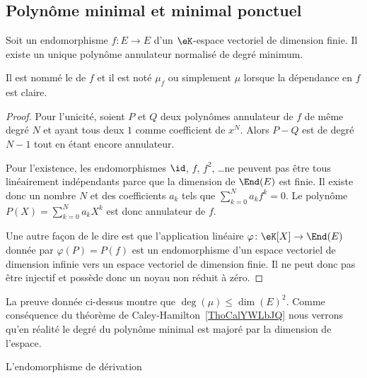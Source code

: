 \subsection{Polynôme minimal et minimal ponctuel}

\begin{lemmaDef}        \label{DefooOHUXooNkPWaB}
    Soit un endomorphisme \( f\colon E\to E\) d'un \( \eK\)-espace vectoriel de dimension finie. Il existe un unique polynôme annulateur normalisé de degré minimum.

    Il est nommé le  de \( f\) et il est noté \( \mu_f\) ou simplement \( \mu\) lorsque la dépendance en \( f\) est claire.
\end{lemmaDef}

\begin{proof}
    Pour l'unicité, soient \( P\) et \( Q\) deux polynômes annulateur de \( f\) de même degré \( N\) et ayant tous deux \( 1\) comme coefficient de \( x^N\). Alors \( P-Q\) est de degré \( N-1\) tout en étant encore annulateur.

    Pour l'existence, les endomorphismes \( \id\), \( f\), \( f^2\), \ldots ne peuvent pas être tous linéairement indépendants parce que la dimension de \( \End(E)\) est finie. Il existe donc un nombre \( N\) et des coefficients \( a_k\) tels que \( \sum_{k=0}^Na_kf^k=0\). Le polynôme \( P(X)=\sum_{k=0}^Na_kX^k\) est donc annulateur de \( f\).

    Une autre façon de le dire est que l'application linéaire \( \varphi\colon \eK[X]\to \End(E)\) donnée par \( \varphi(P)=P(f)\) est un endomorphisme d'un espace vectoriel de dimension infinie vers un espace vectoriel de dimension finie. Il ne peut donc pas être injectif et possède donc un noyau non réduit à zéro.
\end{proof}

\begin{remark}
    La preuve donnée ci-dessus montre que \( \deg(\mu)\leq \dim(E)^2\). Comme conséquence du théorème de Caley-Hamilton~\ref{ThoCalYWLbJQ} nous verrons qu'en réalité le degré du polynôme minimal est majoré par la dimension de l'espace.
\end{remark}

\begin{example}
    L'endomorphisme de dérivation
\end{example}


